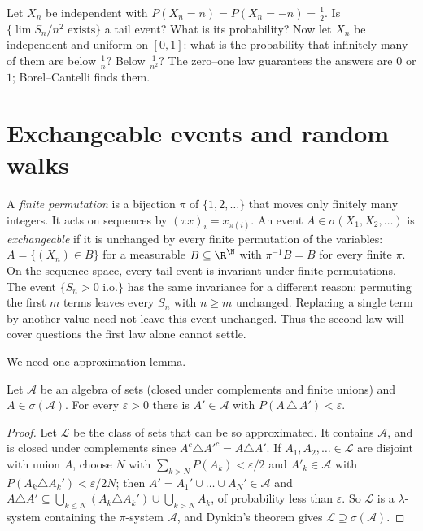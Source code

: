 \begin{think}
Let $X_n$ be independent with $P(X_n=n)=P(X_n=-n)=\frac12$. Is $\{\lim S_n/n^2\text{ exists}\}$ a tail event? What is its
probability? Now let $X_n$ be independent and uniform on $[0,1]$: what is the probability that infinitely many of them are
below $\frac1n$? Below $\frac1{n^2}$? The zero--one law guarantees the answers are $0$ or $1$; Borel--Cantelli finds them.
\end{think}

\section{Exchangeable events and random walks}

A \emph{finite permutation} is a bijection $\pi$ of $\{1,2,\dots\}$ that moves only finitely many integers. It acts on
sequences by $(\pi x)_i=x_{\pi(i)}$. An event $A\in\sigma(X_1,X_2,\dots)$ is \emph{exchangeable} if it is unchanged by every
finite permutation of the variables: $A=\{(X_n)\in B\}$ for a measurable $B\subseteq\R^{\N}$ with $\pi^{-1}B=B$ for every
finite $\pi$. On the sequence space, every tail event is invariant under finite permutations. The event $\{S_n>0\text{ i.o.}\}$ has the same invariance for a different reason: permuting the first $m$ terms leaves every $S_n$ with $n\ge m$ unchanged. Replacing a single term by another value need not leave this event unchanged. Thus the second law will cover questions the first law alone cannot settle.

We need one approximation lemma.

\begin{lemma}\label{lem:approx}
Let $\mathcal A$ be an algebra of sets (closed under complements and finite unions) and $A\in\sigma(\mathcal A)$. For every
$\varepsilon>0$ there is $A'\in\mathcal A$ with $P(A\,\triangle\,A')<\varepsilon$.
\end{lemma}
\begin{proof}
Let $\mathcal L$ be the class of sets that can be so approximated. It contains $\mathcal A$, and is closed under complements
since $A^c\triangle A'^c=A\triangle A'$. If $A_1,A_2,\dots\in\mathcal L$ are disjoint with union $A$, choose $N$ with
$\sum_{k>N}P(A_k)<\varepsilon/2$ and $A'_k\in\mathcal A$ with $P(A_k\triangle A_k')<\varepsilon/2N$; then
$A'=A_1'\cup\dots\cup A_N'\in\mathcal A$ and $A\triangle A'\subseteq\bigcup_{k\le N}(A_k\triangle A_k')\cup\bigcup_{k>N}A_k$,
of probability less than $\varepsilon$. So $\mathcal L$ is a $\lambda$-system containing the $\pi$-system $\mathcal A$, and
Dynkin's theorem gives $\mathcal L\supseteq\sigma(\mathcal A)$.
\end{proof}

